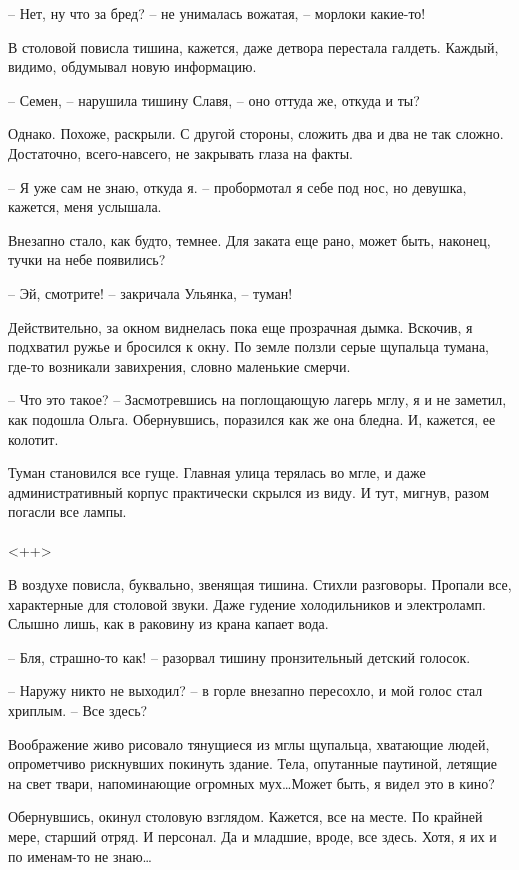 \documentclass[a4paper]{book}
\begin{document}
-- Нет, ну что за бред? -- не унималась вожатая, -- морлоки какие-то!

В столовой повисла тишина, кажется, даже детвора перестала галдеть. Каждый, видимо, обдумывал новую информацию.

-- Семен, -- нарушила тишину Славя, -- оно оттуда же, откуда и ты?

Однако. Похоже, раскрыли. С другой стороны, сложить два и два не так сложно. Достаточно, всего-навсего, не закрывать глаза на факты. 

-- Я уже сам не знаю, откуда я. -- пробормотал я себе под нос, но девушка, кажется, меня услышала.

Внезапно стало, как будто, темнее. Для заката еще рано, может быть, наконец, тучки на небе появились? 

-- Эй, смотрите! -- закричала Ульянка, -- туман!

Действительно, за окном виднелась пока еще прозрачная дымка. Вскочив, я подхватил ружье и бросился к окну. По земле ползли серые щупальца тумана, где-то возникали завихрения, словно маленькие смерчи. 

-- Что это такое? -- Засмотревшись на поглощающую лагерь мглу, я и не заметил, как подошла Ольга. Обернувшись, поразился как же она бледна. И, кажется, ее колотит.

Туман становился все гуще. Главная улица терялась во мгле, и даже административный корпус практически скрылся из виду. И тут, мигнув, разом погасли все лампы. 

\paragraph{}<++>

В воздухе повисла, буквально, звенящая тишина. Стихли разговоры. Пропали все, характерные для столовой звуки. Даже гудение холодильников и электроламп. Слышно лишь, как в раковину из крана капает вода. 

-- Бля, страшно-то как! -- разорвал тишину пронзительный детский голосок.

-- Наружу никто не выходил? -- в горле внезапно пересохло, и мой голос стал хриплым. -- Все здесь?

Воображение живо рисовало тянущиеся из мглы щупальца, хватающие людей, опрометчиво рискнувших покинуть здание. Тела, опутанные паутиной, летящие на свет твари, напоминающие огромных мух\ldots Может быть, я видел это в кино?

Обернувшись, окинул столовую взглядом. Кажется, все на месте. По крайней мере, старший отряд. И персонал. Да и младшие, вроде, все здесь. Хотя, я их и по именам-то не знаю\ldots
\end{document}

